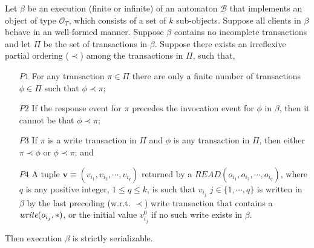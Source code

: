 \begin{lemma}\label{lem:equivalence_app}
Let $\beta$ be an execution (finite or infinite) of  an  automaton $\mathcal{B}$ that implements an object of type $\mathcal{O}_T$, which consists of  a set of $k$ sub-objects.
 Suppose all clients in $\beta$ behave in an well-formed
manner. Suppose $\beta$ contains no incomplete transactions and let  $\Pi$ be the set of transactions in $\beta$. Suppose there exists an irreflexive partial ordering ($\prec$)  among  the transactions
 in $\Pi$, such that,
 \begin{enumerate}
  \item [$P1$] For any transaction $\pi \in \Pi$ there are only a finite number of transactions $\phi \in \Pi$ such that 
    $\phi \prec \pi$;
 \item [$P2$] If the response event for $\pi$ precedes the invocation event for $\phi$ in $\beta$, then it cannot be that $\phi \prec \pi$;
 \item [$P3$]If $\pi$ is a {\sc write} transaction  in $\Pi$ and $\phi$ is any transaction in $\Pi$, then either $\pi \prec \phi$ or $\phi \prec \pi$; and 
 \item [$P4$] \sloppy A tuple 
 $ \mathbf{v} \equiv $$(v_{i_1}, v_{i_2}, \cdots, v_{i_q})$  
returned by a
$READ(o_{i_1}, o_{i_2}, \cdots, o_{i_q})$,  where $q$ is any positive integer, $1 \leq q \leq k$, 
 is such that  $v_{i_j}$  $j \in \{1, \cdots, q\}$ is written in $\beta$ by the last preceding (w.r.t. $\prec$)  {\sc write} transaction that contains a ${ \textit{write}( o_{i_j}, *) }$,
 or the initial value $v_{i_j}^0$ if no such {\sc write} exists in $\beta$. 
 \end{enumerate}
Then execution $\beta$ is strictly serializable.
\end{lemma}

